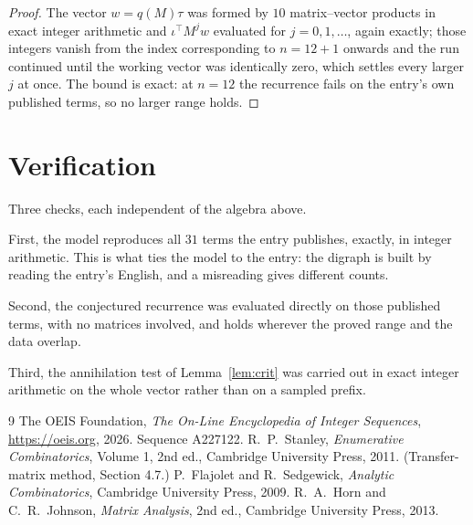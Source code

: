 \documentclass[11pt,a4paper]{article}
\theoremstyle{plain}
\theoremstyle{definition}
\begin{document}
\begin{proof}
The vector $w=q(M)\tau$ was formed by $10$ matrix--vector products in exact integer
arithmetic and $\iota^{\!\top}M^{j}w$ evaluated for $j=0,1,\dots$, again exactly; those
integers vanish from the index corresponding to $n=12+1$ onwards and the run continued
until the working vector was identically zero, which settles every larger $j$ at once. The bound is exact: at $n=12$ the recurrence fails on the entry's own published terms, so no larger range holds.
\end{proof}

\section{Verification}

Three checks, each independent of the algebra above.

First, the model reproduces all $31$ terms the entry publishes, exactly, in integer
arithmetic. This is what ties the model to the entry: the digraph is built by reading the
entry's English, and a misreading gives different counts.

Second, the conjectured recurrence was evaluated directly on those published terms, with no
matrices involved, and holds wherever the proved range and the data overlap.

Third, the annihilation test of Lemma~\ref{lem:crit} was carried out in exact integer
arithmetic on the whole vector rather than on a sampled prefix.

\begin{thebibliography}{9}
 The OEIS Foundation, \emph{The On-Line Encyclopedia of Integer
Sequences}, \url{https://oeis.org}, 2026. Sequence A227122.
 R.~P.~Stanley, \emph{Enumerative Combinatorics}, Volume 1, 2nd ed.,
Cambridge University Press, 2011. (Transfer-matrix method, Section 4.7.)
 P.~Flajolet and R.~Sedgewick, \emph{Analytic Combinatorics}, Cambridge
University Press, 2009.
 R.~A.~Horn and C.~R.~Johnson, \emph{Matrix Analysis}, 2nd ed., Cambridge
University Press, 2013.
\end{thebibliography}
\end{document}
